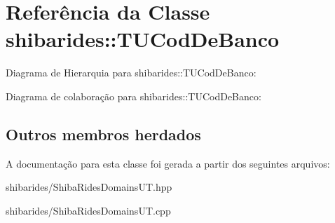 \hypertarget{classshibarides_1_1TUCodDeBanco}{}\section{Referência da Classe shibarides\+:\+:T\+U\+Cod\+De\+Banco}
\label{classshibarides_1_1TUCodDeBanco}


Diagrama de Hierarquia para shibarides\+:\+:T\+U\+Cod\+De\+Banco\+:


Diagrama de colaboração para shibarides\+:\+:T\+U\+Cod\+De\+Banco\+:
\subsection*{Outros membros herdados}


A documentação para esta classe foi gerada a partir dos seguintes arquivos\+:\begin{DoxyCompactItemize}
\item 
shibarides/Shiba\+Rides\+Domains\+U\+T.\+hpp\item 
shibarides/Shiba\+Rides\+Domains\+U\+T.\+cpp\end{DoxyCompactItemize}

